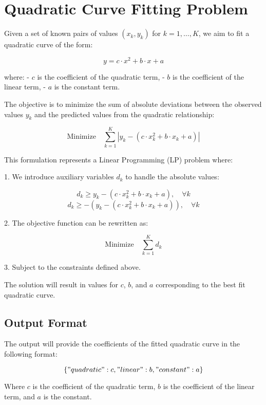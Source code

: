 \documentclass{article}
\begin{document}
\section*{Quadratic Curve Fitting Problem}

Given a set of known pairs of values \( (x_k, y_k) \) for \( k = 1, \ldots, K \), we aim to fit a quadratic curve of the form:

\[
y = c \cdot x^2 + b \cdot x + a
\]

where:
- \( c \) is the coefficient of the quadratic term,
- \( b \) is the coefficient of the linear term,
- \( a \) is the constant term.

The objective is to minimize the sum of absolute deviations between the observed values \( y_k \) and the predicted values from the quadratic relationship:

\[
\text{Minimize} \quad \sum_{k=1}^{K} |y_k - (c \cdot x_k^2 + b \cdot x_k + a)|
\]

This formulation represents a Linear Programming (LP) problem where:

1. We introduce auxiliary variables \( d_k \) to handle the absolute values:
   
   \[
   d_k \geq y_k - (c \cdot x_k^2 + b \cdot x_k + a), \quad \forall k
   \]
   \[
   d_k \geq -(y_k - (c \cdot x_k^2 + b \cdot x_k + a)), \quad \forall k
   \]

2. The objective function can be rewritten as:

\[
\text{Minimize} \quad \sum_{k=1}^{K} d_k
\]

3. Subject to the constraints defined above.

The solution will result in values for \( c \), \( b \), and \( a \) corresponding to the best fit quadratic curve.

\subsection*{Output Format}

The output will provide the coefficients of the fitted quadratic curve in the following format:

\[
\{
    "quadratic": c,
    "linear": b,
    "constant": a
\}
\]

Where \( c \) is the coefficient of the quadratic term, \( b \) is the coefficient of the linear term, and \( a \) is the constant.
\end{document}
